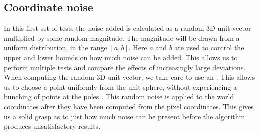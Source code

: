 \subsection{Coordinate noise}
In this first set of tests the noise added is calculated as a random 3D unit vector multiplied by some random magnitude. The magnitude will be drawn from a uniform distribution, in the range $[a,b]$. Here $a$ and $b$ are used to control the upper and lower bounds on how much noise can be added. This allows us to perform multiple tests and compare the effects of increasingly large deviations.\\
When computing the random 3D unit vector, we take care to use an  \cite{cylinder-proj}. This allows us to choose a point uniformly from the unit sphere, without experiencing a bunching of points at the poles \cite{uniform-3d-vector, random-vector}. This random noise is applied to the world coordinates after they have been computed from the pixel coordinates. This gives us a solid grasp as to just how much noise can be present before the algorithm produces unsatisfactory results.\\

